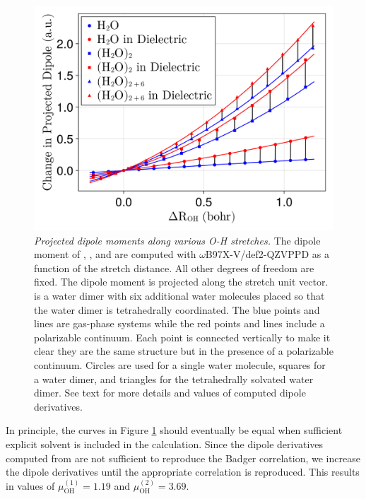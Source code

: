 \documentclass[12pt,letter]{article}
\begin{document}
 \begin{figure} [H]
    \includegraphics[width=\textwidth]{figures/dipole_derivatives.png}
    \caption{\textit{Projected dipole moments along various O-H stretches.}
    The dipole moment of , , and  are computed with
    $\omega$B97X-V/def2-QZVPPD as a function of the  stretch distance. All other degrees of freedom are fixed.
    The dipole moment is projected along the  stretch unit vector. 
    is a water dimer with six additional water molecules placed so that the water dimer is
    tetrahedrally coordinated. The blue points and lines are gas-phase systems while the
    red points and lines include a polarizable continuum. Each point is connected vertically
    to make it clear they are the same structure but in the presence of a polarizable continuum.
    Circles are used for a single water molecule, squares for a water dimer, and triangles for
    the tetrahedrally solvated water dimer. See text for more details and values of computed dipole derivatives.
}
    \label{fig:dip_derivatives}
\end{figure}

In principle, the curves in Figure \ref{fig:dip_derivatives} should eventually be equal when sufficient
explicit solvent is included in the calculation. Since the dipole derivatives computed from
 are not sufficient to reproduce the Badger correlation, we increase
the dipole derivatives until the appropriate correlation is reproduced. This results in values
of $\mu_{\mathrm{OH}}^{(1)}=1.19$ and $\mu_{\mathrm{OH}}^{(2)}=3.69$.
\end{document}
